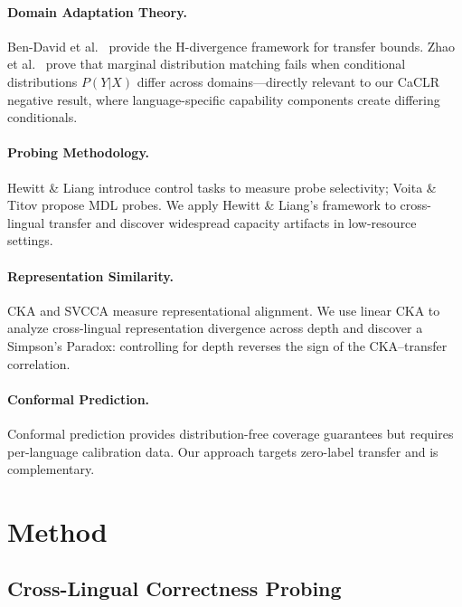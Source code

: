 \documentclass[11pt,a4paper]{article}
\begin{document}
\paragraph{Domain Adaptation Theory.}
Ben-David et al.\ \citeyearpar{bendavid2010theory} provide the H-divergence framework for transfer bounds. Zhao et al.\ \citeyearpar{zhao2019learning} prove that marginal distribution matching fails when conditional distributions $P(Y|X)$ differ across domains---directly relevant to our CaCLR negative result, where language-specific capability components create differing conditionals.

\paragraph{Probing Methodology.}
Hewitt \& Liang \citeyearpar{hewitt2019designing} introduce control tasks to measure probe selectivity; Voita \& Titov \citeyearpar{voita2020information} propose MDL probes. We apply Hewitt \& Liang's framework to cross-lingual transfer and discover widespread capacity artifacts in low-resource settings.

\paragraph{Representation Similarity.}
CKA \cite{kornblith2019similarity} and SVCCA \cite{raghu2017svcca} measure representational alignment. We use linear CKA to analyze cross-lingual representation divergence across depth and discover a Simpson's Paradox: controlling for depth reverses the sign of the CKA--transfer correlation.

\paragraph{Conformal Prediction.}
Conformal prediction \cite{angelopoulos2023conformal} provides distribution-free coverage guarantees but requires per-language calibration data. Our approach targets zero-label transfer and is complementary.


\section{Method}

\subsection{Cross-Lingual Correctness Probing}
\label{sec:probing}
\end{document}
